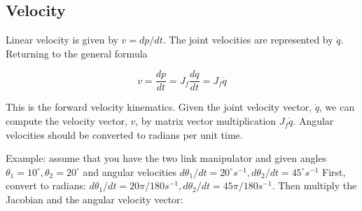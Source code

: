 \hypertarget{listjacobian}{%
\label{listjacobian}}%
\begin{Shaded}
\begin{Highlighting}[]
 \OperatorTok{=} \OperatorTok{*}\OperatorTok{/}
 \OperatorTok{=} \OperatorTok{*}\OperatorTok{/}
\OperatorTok{=}\OperatorTok{=} 
\OperatorTok{=} \OperatorTok{{-}}\OperatorTok{*}\OperatorTok{+}\NormalTok{) }\OperatorTok{{-}}\OperatorTok{*}\NormalTok{)}
\OperatorTok{=} \OperatorTok{{-}}\OperatorTok{*}\OperatorTok{+}\NormalTok{)}
\OperatorTok{=}\OperatorTok{*}\OperatorTok{+}\NormalTok{) }\OperatorTok{+}\OperatorTok{*}\NormalTok{)}
\OperatorTok{=}\OperatorTok{*}\OperatorTok{+}\NormalTok{)}
\OperatorTok{=}\NormalTok{ [ j11 j12 }\OperatorTok{;}\NormalTok{ j21 j22]}
\end{Highlighting}
\end{Shaded}

\hypertarget{jacobianvelocity}{%
\subsection{Velocity}\label{jacobianvelocity}}

Linear velocity is given by \(v = dp/dt\). The joint velocities are
represented by \(\dot{q}\). Returning to the general formula

\[\displaystyle v = \frac{dp}{dt} = J_f \frac{dq}{dt} = J_f \dot{q}\]

This is the forward velocity kinematics. Given the joint velocity
vector, \(\dot{q}\), we can compute the velocity vector, \(v\), by
matrix vector multiplication \(J_f \dot{q}\). Angular velocities should
be converted to radians per unit time.

Example: assume that you have the two link manipulator and given angles
\(\theta_1 = 10^\circ, \theta_2 = 20^\circ\) and angular velocities
\(d\theta_1 / dt = 20^\circ s^{-1}, d\theta_2 / dt = 45^\circ s^{-1}\)
First, convert to radians:
\(d\theta_1 / dt = 20\pi/180 s^{-1}, d\theta_2 / dt = 45\pi/180 s^{-1}\).
Then multiply the Jacobian and the angular velocity vector:

